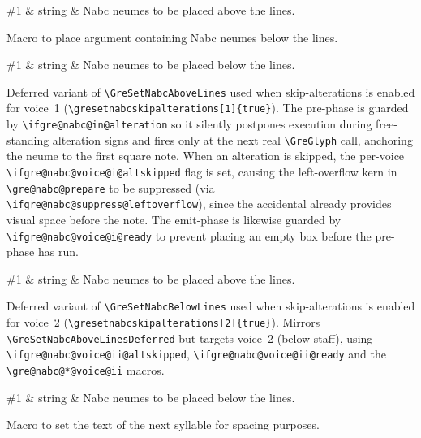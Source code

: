 \begin{argtable}
  \#1 & string & Nabc neumes to be placed above the lines.\\
\end{argtable}

Macro to place argument containing Nabc neumes below the lines.

\begin{argtable}
  \#1 & string & Nabc neumes to be placed below the lines.\\
\end{argtable}

Deferred variant of \verb=\GreSetNabcAboveLines= used when skip-alterations is
enabled for voice~1 (\verb=\gresetnabcskipalterations[1]{true}=).  The
pre-phase is guarded by \verb=\ifgre@nabc@in@alteration= so it silently
postpones execution during free-standing alteration signs and fires only at
the next real \verb=\GreGlyph= call, anchoring the neume to the first square
note.  When an alteration is skipped, the per-voice
\verb=\ifgre@nabc@voice@i@altskipped= flag is set, causing the left-overflow
kern in \verb=\gre@nabc@prepare= to be suppressed (via
\verb=\ifgre@nabc@suppress@leftoverflow=), since the accidental already
provides visual space before the note.  The emit-phase is likewise guarded by
\verb=\ifgre@nabc@voice@i@ready= to prevent placing an empty box before the
pre-phase has run.

\begin{argtable}
  \#1 & string & Nabc neumes to be placed above the lines.\\
\end{argtable}

Deferred variant of \verb=\GreSetNabcBelowLines= used when skip-alterations is
enabled for voice~2 (\verb=\gresetnabcskipalterations[2]{true}=).  Mirrors
\verb=\GreSetNabcAboveLinesDeferred= but targets voice~2 (below staff), using
\verb=\ifgre@nabc@voice@ii@altskipped=, \verb=\ifgre@nabc@voice@ii@ready=
and the \verb=\gre@nabc@*@voice@ii= macros.

\begin{argtable}
  \#1 & string & Nabc neumes to be placed below the lines.\\
\end{argtable}

Macro to set the text of the next syllable for spacing purposes.

